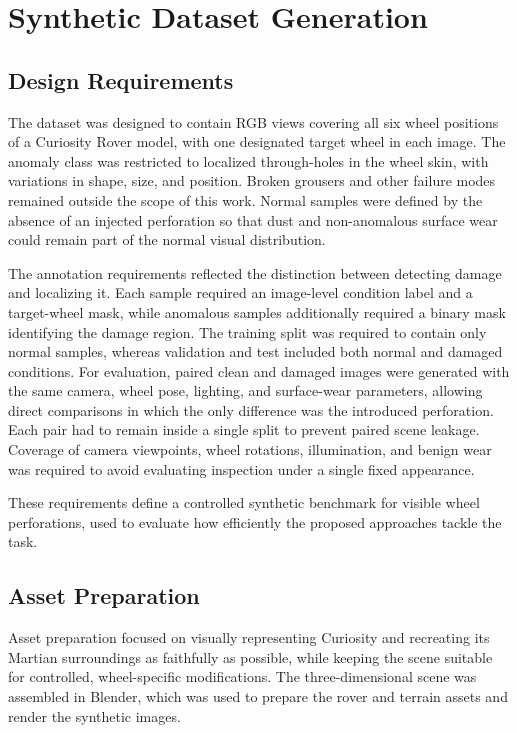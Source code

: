 \chapter{Synthetic Dataset Generation}


\section{Design Requirements}
The dataset was designed to contain RGB views covering all six wheel positions of a Curiosity Rover model, with one designated target wheel in each image. The anomaly class was restricted to localized through-holes in the wheel skin, with variations in shape, size, and position. Broken grousers and other failure modes remained outside the scope of this work. Normal samples were defined by the absence of an injected perforation so that dust and non-anomalous surface wear could remain part of the normal visual distribution.

The annotation requirements reflected the distinction between detecting damage and localizing it. Each sample required an image-level condition label and a target-wheel mask, while anomalous samples additionally required a binary mask identifying the damage region. The training split was required to contain only normal samples, whereas validation and test included both normal and damaged conditions. For evaluation, paired clean and damaged images were generated with the same camera, wheel pose, lighting, and surface-wear parameters, allowing direct comparisons in which the only difference was the introduced perforation. Each pair had to remain inside a single split to prevent paired scene leakage. Coverage of camera viewpoints, wheel rotations, illumination, and benign wear was required to avoid evaluating inspection under a single fixed appearance.

These requirements define a controlled synthetic benchmark for visible wheel perforations, used to evaluate how efficiently the proposed approaches tackle the task.

\section{Asset Preparation}
Asset preparation focused on visually representing Curiosity and recreating its Martian surroundings as faithfully as possible, while keeping the scene suitable for controlled, wheel-specific modifications. The three-dimensional scene was assembled in Blender, which was used to prepare the rover and terrain assets and render the synthetic images.

